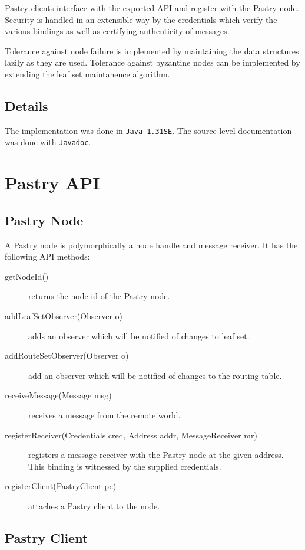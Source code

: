 \documentclass{article}
\begin{document}
Pastry clients interface with the exported API and register with the
Pastry node.  Security is handled in an extensible way by the
credentials which verify the various bindings as well as certifying
authenticity of messages.

Tolerance against node failure is implemented by maintaining the data
structures lazily as they are used.  Tolerance against byzantine nodes
can be implemented by extending the leaf set maintanence algorithm.

\subsection{Details}

The implementation was done in {\tt Java 1.31SE}.  The source level
documentation was done with {\tt Javadoc}.

\section{Pastry API}
\subsection{Pastry Node}

A Pastry node is polymorphically a node handle and message receiver.
It has the following API methods:

\begin{description}

\item [getNodeId()] returns the node id of the Pastry node.
\item [addLeafSetObserver(Observer o)] adds an observer which will be
  notified of changes to leaf set.
\item [addRouteSetObserver(Observer o)] add an observer which will be
  notified of changes to the routing table.
\item [receiveMessage(Message msg)] receives a message from the remote
  world.
\item [registerReceiver(Credentials cred, Address addr, MessageReceiver mr)] registers a message
  receiver with the Pastry node at the given address.   This binding
  is witnessed by the supplied credentials.
\item [registerClient(PastryClient pc)] attaches a Pastry client to the node.

\end{description}

\subsection{Pastry Client}
\end{document}
